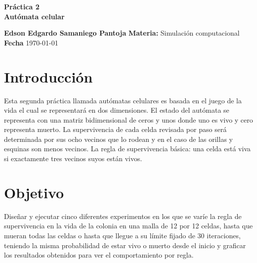 \documentclass[a4paper, 11pt]{article}
\begin{document}
\begin{center}
\LARGE \bf Pr\'actica 2\\ Autómata celular
\end{center}

\vspace{1cm} 
\noindent\textbf {Edson Edgardo Samaniego Pantoja} \hfill \textbf{Materia:} Simulación computacional 
\hfill \\
\textbf{Fecha} \today  
\vspace{1cm} 

\section{Introducción}
Esta segunda práctica llamada autómatas celulares es basada en el juego de la vida el cual se representará en dos dimensiones. El estado del autómata se representa con una matriz bidimensional de ceros y unos donde uno es vivo y cero representa muerto. La supervivencia de cada celda revisada por paso será determinada por sus ocho vecinos que lo rodean y en el caso de las orillas y esquinas son menos vecinos.
La regla de supervivencia básica: una celda está viva si exactamente tres vecinos suyos están vivos.

\section{Objetivo}
Diseñar y ejecutar cinco diferentes experimentos en los que se varíe la regla de supervivencia en la vida de la colonia en una malla de 12 por 12 celdas, hasta que mueran todas las celdas o hasta que llegue a su límite fijado de 30 iteraciones, teniendo la misma probabilidad de estar vivo o muerto desde el inicio y graficar los resultados obtenidos para ver el comportamiento por regla.
\end{document}
